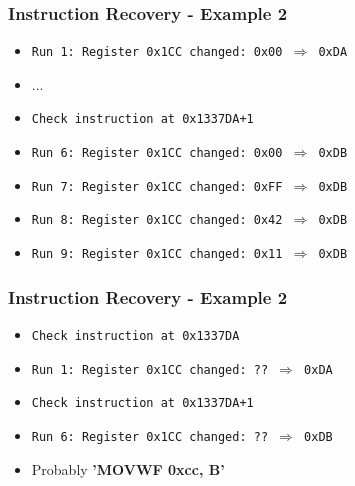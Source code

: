 \documentclass[aspectratio=169]{beamer}
\begin{document}
\begin{frame}
	\frametitle{Instruction Recovery - Example 2}

	\begin{itemize}
		\item \texttt{Run 1: Register 0x1CC changed: 0x00 $\Rightarrow$ 0xDA}
		\item ...
		\item \texttt{Check instruction at 0x1337DA+1}
		\item \texttt{Run 6: Register 0x1CC changed: 0x00 $\Rightarrow$ 0xDB}
		\item \texttt{Run 7: Register 0x1CC changed: 0xFF $\Rightarrow$ 0xDB}
		\item \texttt{Run 8: Register 0x1CC changed: 0x42 $\Rightarrow$ 0xDB}
		\item \texttt{Run 9: Register 0x1CC changed: 0x11 $\Rightarrow$ 0xDB}
	\end{itemize}
\end{frame}

\begin{frame}
	\frametitle{Instruction Recovery - Example 2}

	\begin{itemize}
		\item \texttt{Check instruction at 0x1337DA}
		\item \texttt{Run 1: Register 0x1CC changed: ?? $\Rightarrow$ 0xDA}
		\item \texttt{Check instruction at 0x1337DA+1}
		\item \texttt{Run 6: Register 0x1CC changed: ?? $\Rightarrow$ 0xDB}
		\item Probably \textbf{'MOVWF 0xcc, B'}
	\end{itemize}
\end{frame}
\end{document}
